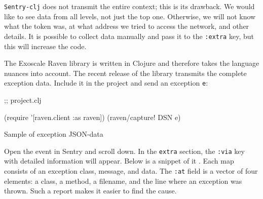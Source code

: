 \verb|Sentry-clj| does not transmit the entire context; this is its drawback. We would like to see data from all levels, not just the top one. Otherwise, we will not know what the token was, at what address we tried to access the network, and other details. It is possible to collect data manually and pass it to the \verb|:extra| key, but this will increase the code.


The Exoscale Raven library is written in Clojure and therefore takes the language nuances into account. The recent release of the library transmits the complete exception data. Include it in the project and send an exception \verb|e|:

\begin{clojure}
 ;; project.clj

(require '[raven.client :as raven])
(raven/capture! DSN e)
\end{clojure}

\begin{listing}[ht!]

\ifnarrow

\begin{json}
\end{json}

\else

\begin{json}
\end{json}

\fi

  \caption{Sample of exception JSON-data}
  \label{fig:ex-json-data}
\end{listing}

Open the event in Sentry and scroll down. In the \verb|extra| section, the \verb|:via| key with detailed information will appear. Below is a snippet of it . Each map consists of an exception class, message, and data. The \verb|:at| field is a vector of four elements: a class, a method, a filename, and the line where an exception was thrown. Such a report makes it easier to find the cause.

